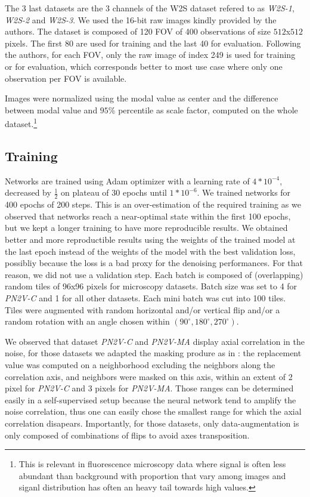 \documentclass{article}
\begin{document}
The 3 last datasets are the 3 channels of the W2S dataset\cite{zhou2020w2s} refered to as \emph{W2S-1}, \emph{W2S-2} and \emph{W2S-3}.
We used the 16-bit raw images kindly provided by the authors.
The dataset is composed of 120 FOV of 400 observations of size $512$x$512$ pixels.
The first 80 are used for training and the last 40 for evaluation.
Following the authors, for each FOV, only the raw image of index 249 is used for training or for evaluation, which corresponds better to most use case where only one observation per FOV is available.

Images were normalized using the modal value as center and the difference between modal value and $95\%$ percentile as scale factor, computed on the whole dataset.\footnote{This is relevant in fluorescence microscopy data where signal is often less abundant than background with proportion that vary among images and siganl distribution has often an heavy tail towards high values.}

\subsection{Training}
Networks are trained using Adam optimizer with a learning rate of $4*10^{-4}$, decreased by $\frac{1}{2}$ on plateau of 30 epochs until $1*10^{-6}$. We trained networks for 400 epochs of 200 steps.
This is an over-estimation of the required training as we observed that networks reach a near-optimal state within the first 100 epochs, but we kept a longer training to have more reproducible results.
We obtained better and more reproductible results using the weights of the trained model at the last epoch instead of the weights of the model with the best validation loss, possibliy because the loss is a bad proxy for the denoising performances. For that reason, we did not use a validation step.
Each batch is composed of (overlapping) random tiles of 96x96 pixels for microscopy datasets.
Batch size was set to 4 for \emph{PN2V-C} and 1 for all other datasets.
Each mini batch was cut into 100 tiles.
Tiles were augmented with random horizontal and/or vertical flip and/or a random rotation with an angle chosen within $(90^\circ, 180^\circ, 270^\circ)$.

We observed that dataset \emph{PN2V-C} and \emph{PN2V-MA} display axial correlation in the noise, for those datasets we adapted the masking produre as in \cite{broaddus2020removing}: the replacement value was computed on a neighborhood excluding the neighbors along the correlation axis, and neighbors were masked on this axis, within an extent of 2 pixel for \emph{PN2V-C} and 3 pixels for \emph{PN2V-MA}.
Those ranges can be determined easily in a self-supervised setup because the neural network tend to amplify the noise correlation, thus one can easily chose the smallest range for which the axial correlation disapears.
Importantly, for those datasets, only data-augmentation is only composed of combinations of flips to avoid axes transposition.
\end{document}
